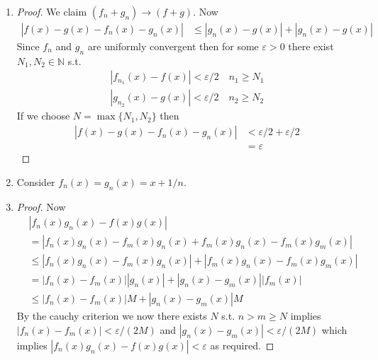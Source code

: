 \begin{enumerate}[label=(\alph*)]
    \item 
    \begin{proof}
        We claim $(f_n+g_n)\rightarrow (f+g)$.
        Now
        \begin{align*}
            |f(x)-g(x) - f_n(x)-g_n(x)| &\leq |g_n(x)-g(x)| +|g_n(x)-g(x)| 
        \end{align*}
        Since $f_n$ and $g_n$ are uniformly convergent then for some 
        $\varepsilon>0$ there 
        exist $N_1, N_2 \in \mathbb{N}$ s.t. 
        \begin{align*}
            |f_{n_1}(x)-f(x)| < \varepsilon/2 \quad n_1\geq N_1 \\
            |g_{n_2}(x)-g(x)| < \varepsilon/2 \quad n_2\geq N_2
        \end{align*}
        If we choose $N=\max\{N_1, N_2\}$ then 
        \begin{align*}
            |f(x)-g(x) - f_n(x)-g_n(x)| &< \varepsilon/2 + \varepsilon/2 \\
            &= \varepsilon
        \end{align*}
    \end{proof}

    \item
    Consider $f_n(x)=g_n(x)=x+1/n$.

    \item
    \begin{proof}
        Now 
        \begin{align*}
            &|f_n(x)g_n(x)-f(x)g(x)| \\ &= |f_n(x)g_n(x)-f_m(x)g_n(x)+f_m(x)g_n(x)-f_m(x)g_m(x)| \\
            &\leq  |f_n(x)g_n(x)-f_m(x)g_n(x)|+|f_m(x)g_n(x)-f_m(x)g_m(x)| \\
            &=  |f_n(x)-f_m(x)||g_n(x)|+|g_n(x)-g_m(x)||f_m(x)| \\
            &\leq  |f_n(x)-f_m(x)|M+|g_n(x)-g_m(x)|M
        \end{align*}
        By the cauchy criterion we now there exists $N$ s.t. 
        $n>m\geq N$ implies $|f_n(x)-f_m(x)|<\varepsilon/(2M)$ and 
        $|g_n(x)-g_m(x)|<\varepsilon/(2M)$ which implies 
        $|f_n(x)g_n(x)-f(x)g(x)|<\varepsilon$ as required.
    \end{proof}
\end{enumerate}

